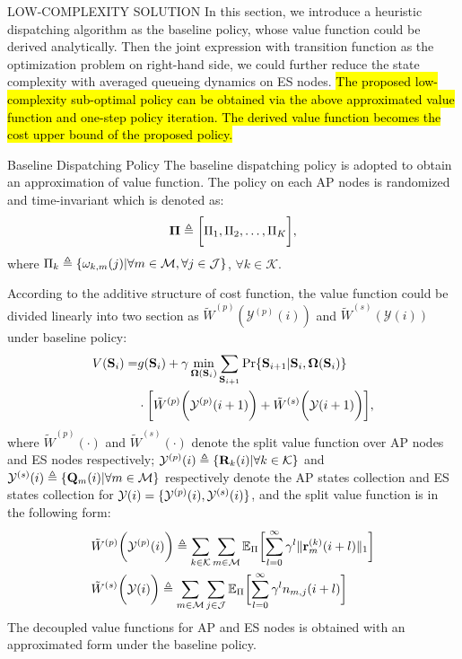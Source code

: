 \documentclass[10pt, conference, letterpaper]{IEEEtran}
\newcommand{\mat}{\mathbf}
\newcommand{\define}{\triangleq}
\renewcommand{\vec}{\mathbf}
\DeclarePairedDelimiter{\set}{\{}{\}}
\DeclarePairedDelimiter{\Inorm}{\|}{\|_1}
\DeclarePairedDelimiter{\Paren}{\bigg(}{\bigg)}
\DeclarePairedDelimiter{\Bracket}{\bigg[}{\bigg]}
\newcommand{\apSet}{\mathcal{K}}
\newcommand{\esSet}{\mathcal{M}}
\newcommand{\jSpace}{\mathcal{J}}
\newcommand{\Stat}{\mathbf{S}}
\newcommand{\Obsv}{\mathcal{Y}}
\newcommand{\Policy}{\mathbf{\Omega}}
\begin{document}
    \begin{section}{LOW-COMPLEXITY SOLUTION}
        \label{sec:algorithm}
        In this section, we introduce a heuristic dispatching algorithm as the baseline policy, whose value function could be derived analytically. Then the joint expression with transition function as the optimization problem on right-hand side, we could further reduce the state complexity with averaged queueing dynamics on ES nodes.
        \hl{The proposed low-complexity sub-optimal policy can be obtained via the above approximated value function and one-step policy iteration. The derived value function becomes the cost upper bound of the proposed policy.}

        \begin{subsection}{Baseline Dispatching Policy}
            The baseline dispatching policy is adopted to obtain an approximation of value function. The policy on each AP nodes is randomized and time-invariant which is denoted as:
            \begin{align}
                \vec{\Pi} \define \Bracket{\Pi_1, \Pi_2, \dots, \Pi_K},
            \end{align}
            where $\Pi_k \define \set{\omega_{k,m}(j)|\forall m\in\esSet,\forall j\in\jSpace}$, $\forall k\in\apSet$.

            According to the additive structure of cost function, the value function could be divided linearly into two section as $\tilde{W}^{(p)}(\Obsv^{(p)}(i))$ and $\tilde{W}^{(s)}(\Obsv(i))$ under baseline policy:
            \begin{align}
                V(\Stat_{i}) =& 
                    g(\Stat_{i}) + \gamma \min_{\Policy(\Stat_{i})} \sum_{\Stat_{i+1}} \Pr\{ \Stat_{i+1}|\Stat_{i}, \Policy(\Stat_{i}) \}
                    \nonumber\\
                    & \cdot \Bracket{ \tilde{W}^{(p)}\Paren{\Obsv^{(p)}(i+1)} + \tilde{W}^{(s)}\Paren{\Obsv(i+1)} },
            \end{align}
            where $\tilde{W}^{(p)}(\cdot)$ and $\tilde{W}^{(s)}(\cdot)$ denote the split value function over AP nodes and ES nodes respectively; $\Obsv^{(p)}(i) \define \set{\mat{R}_k(i)|\forall k\in\apSet}$ and $\Obsv^{(s)}(i) \define \set{\vec{Q}_m(i)|\forall m\in\esSet}$ respectively denote the AP states collection and ES states collection for $\Obsv(i) = \set{\Obsv^{(p)}(i), \Obsv^{(s)}(i)}$, and the split value function is in the following form:
            \begin{align}
                &\tilde{W}^{(p)}\Paren{\Obsv^{(p)}(i)} \define \sum_{k\in\apSet}\sum_{m\in\esSet}
                    \mathbb{E}_{\Pi}\Bracket{\sum_{l=0}^{\infty} \gamma^{l} \Inorm{\vec{r}^{(k)}_{m}(i+l)}}
                \\
                &\tilde{W}^{(s)}\Paren{\Obsv(i)} \define \sum_{m\in\esSet} \sum_{j\in\jSpace}
                    \mathbb{E}_{\Pi}\Bracket{\sum_{l=0}^{\infty} \gamma^{l} n_{m,j}(i+l)}
            \end{align}
            The decoupled value functions for AP and ES nodes is obtained with an approximated form under the baseline policy.


\end{subsection}
\end{section}
\end{document}
